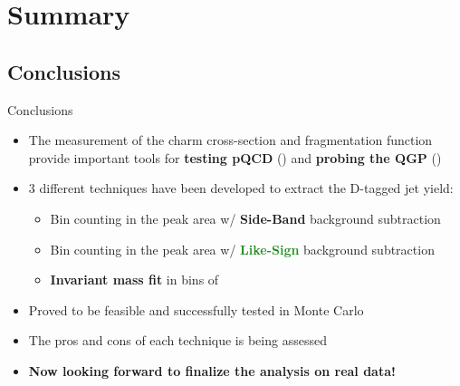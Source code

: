 \documentclass[xcolor={usenames,dvipsnames}]{beamer}
\begin{document}
\section*{Summary}

\subsection*{Conclusions}
\begin{frame}{Conclusions}
\begin{itemize}
\item The measurement of the charm cross-section and fragmentation function provide important tools for
\textbf{\alert{testing pQCD}} (\pp) and \textbf{\alert{probing the QGP}} (\PbPb)
\item 3 different techniques have been developed to extract the D-tagged jet yield:
\begin{itemize}
\item Bin counting in the peak area w/ \textbf{\textcolor{BrickRed}{Side-Band}} background subtraction
\item Bin counting in the peak area w/ \textbf{\textcolor{ForestGreen}{Like-Sign}} background subtraction
\item \textbf{\textcolor{NavyBlue}{Invariant mass fit}} in bins of \ptchjet
\end{itemize}
\item Proved to be \alert{feasible} and \alert{successfully tested} in Monte Carlo
\item The pros and cons of each technique is being assessed
\item \textbf{\alert{Now looking forward to finalize the analysis on real data!}}
\end{itemize}
\end{frame}
\end{document}
